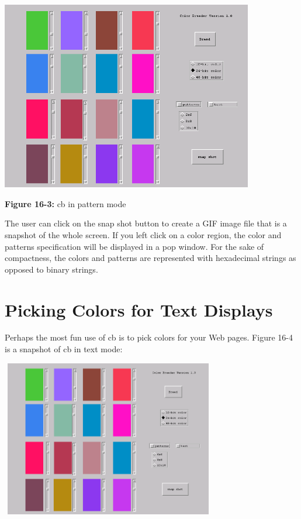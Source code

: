 \begin{center}
\includegraphics[width=4.3335in,height=3.252in]{ub-img/ub-img47.png}
\end{center}

{\sffamily\bfseries Figure 16-3:}
{\sffamily cb in pattern mode}

The user can click on the snap shot button to create a GIF image file
that is a snapshot of the whole screen. If you left click on a color
region, the color and patterns specification will be displayed in a pop
window. For the sake of compactness, the colors and patterns are
represented with hexadecimal strings as opposed to binary strings. 

\section{Picking Colors for Text Displays}

Perhaps the most fun use of \textsf{cb} is to pick colors for your Web
pages. Figure 16-4 is a snapshot of \textsf{cb} in text mode:

\bigskip

\begin{center}
\includegraphics[width=3.6811in,height=2.6929in]{ub-img/ub-img48.png}
\end{center}

